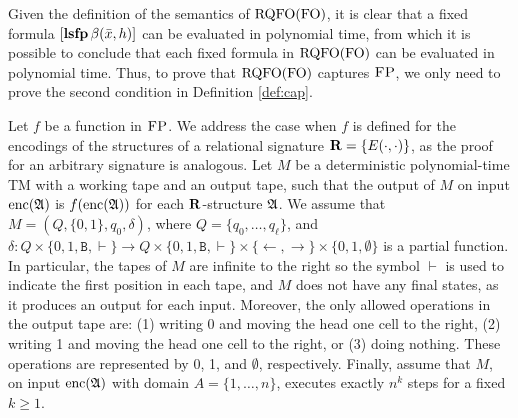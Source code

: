 
\newcommand{\ttB}{\mathtt{B}}
\newcommand{\successor}{\text{succ}}
\newcommand{\out}{\text{\it out}}

Given the definition of the semantics of ${\rm RQFO}({\rm FO})$, it is clear that a fixed formula $[{\bf lsfp} \, \beta(\bar{x}, h)]$ can be evaluated in polynomial time, from which it is possible to conclude that each fixed formula in ${\rm RQFO}({\rm FO})$ can be evaluated in polynomial time. Thus, to prove that ${\rm RQFO}({\rm FO})$ captures $\text{\sc FP}$, we only need to prove the second condition in Definition \ref{def:cap}.

Let $f$ be a function in $\text{\sc FP}$. We address the case when $f$ is defined for the encodings of the structures of a relational signature $\mathbf{R} = \{ E(\cdot, \cdot) \}$, as the proof for an arbitrary signature is analogous.
 Let $M$ be a deterministic polynomial-time TM with a working tape and an output tape, such that the output of $M$ on input ${\rm enc}(\mathfrak{A})$ is $f({\rm enc}(\mathfrak{A}))$ for each $\mathbf{R}$-structure $\mathfrak{A}$. We assume that $M = (Q,\{0,1\},q_0,\delta)$, 
 where $Q = \{q_0,\ldots,q_{\ell}\}$, and $\delta:Q\times\{0,1,\ttB, \vdash\}\to Q\times\{0,1,\ttB, \vdash\}\times \{\leftarrow,\rightarrow\}\times\{0,1,\emptyset\}$ is a partial function. In particular, the tapes of $M$ are infinite to the right so the symbol $\vdash$ is used to indicate the first position in each tape, and $M$ does not have any final states, as it produces an output for each input. Moreover, the only allowed operations in the output tape are: 
 (1) writing 0 and moving the head one cell to the right, (2) writing 1 and moving the head one cell to the right, or (3) doing nothing. These operations are represented by 0, 1, and $\emptyset$, respectively. Finally, assume that $M$, on input ${\rm enc}(\mathfrak{A})$ with domain $A = \{1,\dots,n\}$, executes exactly $n^k$ steps for a fixed $k \geq 1$.

